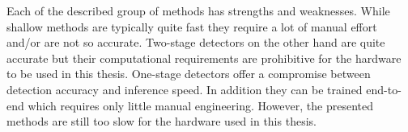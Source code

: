 Each of the described group of methods has strengths and weaknesses. While shallow methods are typically quite fast they require a lot of manual effort and/or are not so accurate. Two-stage detectors on the other hand are quite accurate but their computational requirements are prohibitive for the hardware to be used in this thesis. One-stage detectors offer a compromise between detection accuracy and inference speed. In addition they can be trained end-to-end which requires only little manual engineering. However, the presented methods are still too slow for the hardware used in this thesis.


	

	



